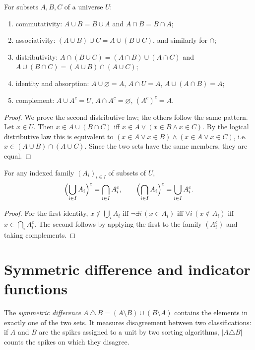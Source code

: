 \begin{proposition}
For subsets $A,B,C$ of a universe $U$:
\begin{enumerate}[leftmargin=2em]
\item commutativity: $A\cup B=B\cup A$ and $A\cap B=B\cap A$;
\item associativity: $(A\cup B)\cup C=A\cup(B\cup C)$, and similarly for $\cap$;
\item distributivity: $A\cap(B\cup C)=(A\cap B)\cup(A\cap C)$ and $A\cup(B\cap C)=(A\cup B)\cap(A\cup C)$;
\item identity and absorption: $A\cup\varnothing=A$, $A\cap U=A$, $A\cup(A\cap B)=A$;
\item complement: $A\cup A^c=U$, $A\cap A^c=\varnothing$, $(A^c)^c=A$.
\end{enumerate}
\end{proposition}
\begin{proof}
We prove the second distributive law; the others follow the same pattern. Let $x\in U$. Then $x\in A\cup(B\cap C)$ iff $x\in A\lor(x\in B\land x\in C)$. By the logical distributive law this is equivalent to $(x\in A\lor x\in B)\land(x\in A\lor x\in C)$, i.e.\ $x\in(A\cup B)\cap(A\cup C)$. Since the two sets have the same members, they are equal.
\end{proof}

\begin{proposition}
For any indexed family $(A_i)_{i\in I}$ of subsets of $U$,
\[
\Bigl(\bigcup_{i\in I}A_i\Bigr)^c=\bigcap_{i\in I}A_i^c,\qquad
\Bigl(\bigcap_{i\in I}A_i\Bigr)^c=\bigcup_{i\in I}A_i^c.
\]
\end{proposition}
\begin{proof}
For the first identity, $x\notin\bigcup_iA_i$ iff $\neg\exists i\,(x\in A_i)$ iff $\forall i\,(x\notin A_i)$ iff $x\in\bigcap_iA_i^c$. The second follows by applying the first to the family $(A_i^c)$ and taking complements.
\end{proof}

\section{Symmetric difference and indicator functions}
The \emph{symmetric difference} $A\,\triangle\,B=(A\setminus B)\cup(B\setminus A)$ contains the elements in exactly one of the two sets. It measures disagreement between two classifications: if $A$ and $B$ are the spikes assigned to a unit by two sorting algorithms, $|A\triangle B|$ counts the spikes on which they disagree.

